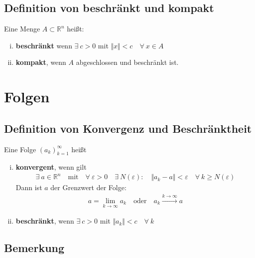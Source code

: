 \documentclass[11pt,a4paper]{book}
\newcommand {\Rn}	{\mathbb{R}^n}
\newcommand{\1}    	{\mathbbm{1}}
\begin{document}
\subsection{Definition von beschränkt und kompakt}
Eine Menge \(A \subset \Rn\) heißt:
\begin{enumerate}[(i)]
	\item \textbf{beschränkt} wenn \(\exists~ c > 0 \) mit \( \Vert x \Vert < c \quad \forall~ x \in A\)
	\item \textbf{kompakt}, wenn \(A\) abgeschlossen und beschränkt ist.
\end{enumerate}

\section{Folgen}

\subsection{Definition von Konvergenz und Beschränktheit}

Eine Folge \((a_k)_{k=1}^\infty \) heißt
\begin{enumerate}[(i)]
	\item \textbf{konvergent}, wenn gilt
	\begin{align*}
		\exists~ a \in \Rn \quad \textrm{mit} \quad \forall~ \varepsilon > 0 \quad \exists~ N(\varepsilon) : \quad \Vert a_k - a \Vert < \varepsilon \quad \forall~ k \geqslant N(\varepsilon)
	\end{align*}
	Dann ist \(a\) der Grenzwert der Folge:
	\begin{align*}
		a = \lim_{k \rightarrow \infty} a_k \quad \textrm{oder} \quad a_k \stackrel{k \rightarrow \infty}{\rightarrow} a
	\end{align*}
	\item \textbf{beschränkt}, wenn \(\exists~ c > 0 \) mit \(\Vert a_k \Vert < c \quad \forall~ k \)
\end{enumerate}

\subsection{Bemerkung}
\end{document}
